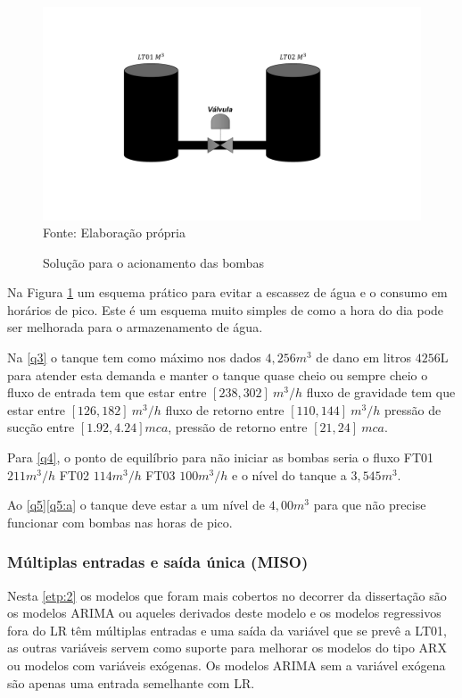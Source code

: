 \begin{figure}[H]
	\centering
	\caption{Solução para o acionamento das bombas}
	\label{fig:esquema}
	\includegraphics[width=1\linewidth]{Resultados/Figuras/esquema}
	Fonte: Elaboração própria 
\end{figure}

Na Figura \ref{fig:esquema} um esquema prático para evitar a escassez de água e o consumo em horários de pico. Este é um esquema muito simples de como a hora do dia pode ser melhorada para o armazenamento de água.

Na \ref{q3} o tanque tem como máximo nos dados $4,256 m^3$ de dano em litros $4256$L para atender esta demanda e manter o tanque quase cheio ou sempre cheio o fluxo de entrada tem que estar entre $[238,302] \ m^3/h$ fluxo de gravidade tem que estar entre $[126,182] \ m^3/h$ fluxo de retorno entre $[110,144] \ m^3/h$ pressão de sucção entre $[1.92,4.24] mca$, pressão de retorno entre $[21,24] \ mca$.

Para \ref{q4}, o ponto de equilíbrio para não iniciar as bombas seria o fluxo FT01 $211 m^3/h$ FT02 $114 m^3/h$ FT03 $100m^3/h$ e o nível do tanque a $3,545 m^3$.

Ao \ref{q5}\ref{q5:a} o tanque deve estar a um nível de $4,00 m^3$ para que não precise funcionar com bombas nas horas de pico. 

\subsubsection{M\'ultiplas entradas e sa\'ida \'unica (MISO)}

Nesta \ref{etp:2} os modelos que foram mais cobertos no decorrer da dissertação são os modelos ARIMA ou aqueles derivados deste modelo e os modelos regressivos fora do LR têm múltiplas entradas e uma saída da variável que se prevê a LT01, as outras variáveis servem como suporte para melhorar os modelos do tipo ARX ou modelos com variáveis exógenas. Os modelos ARIMA sem a variável exógena são apenas uma entrada semelhante com LR.


